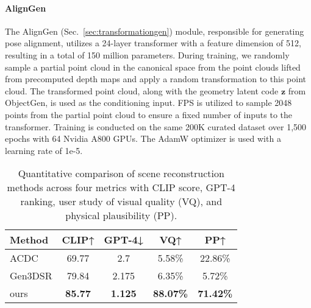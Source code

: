 \paragraph{AlignGen}
The AlignGen (Sec.~\ref{sec:transformationgen}) module, responsible for generating pose alignment, utilizes a 24-layer transformer with a feature dimension of 512, resulting in a total of 150 million parameters. 
During training, we randomly sample a partial point cloud in the canonical space from the point clouds lifted from precomputed depth maps and apply a random transformation to this point cloud. The transformed point cloud, along with the geometry latent code $\bm{z}$ from ObjectGen, is used as the conditioning input.
FPS is utilized to sample 2048 points from the partial point cloud to ensure a fixed number of inputs to the transformer.
Training is conducted on the same 200K curated dataset over 1,500 epochs with 64 Nvidia A800 GPUs. The AdamW optimizer is used with a learning rate of 1e-5.


\begin{table}[]
\centering
\caption{Quantitative comparison of scene reconstruction methods across four metrics with CLIP score, GPT-4 ranking, user study of visual quality (VQ), and physical plausibility (PP).}
\label{tab:performance_comparison_visual}
\begin{tabular}{lcccc}
\toprule
\textbf{Method}& CLIP↑ & GPT-4↓ &  VQ↑  & PP↑   \\ \midrule
ACDC     & 69.77  & 2.7   &  5.58\% &  22.86\%  \\
Gen3DSR  & 79.84  & 2.175   &  6.35\%  & 5.72\% \\
ours     & \textbf{85.77}  & \textbf{1.125}   &  \textbf{88.07\%} & \textbf{71.42\%} \\ \bottomrule
\end{tabular}
\end{table}

